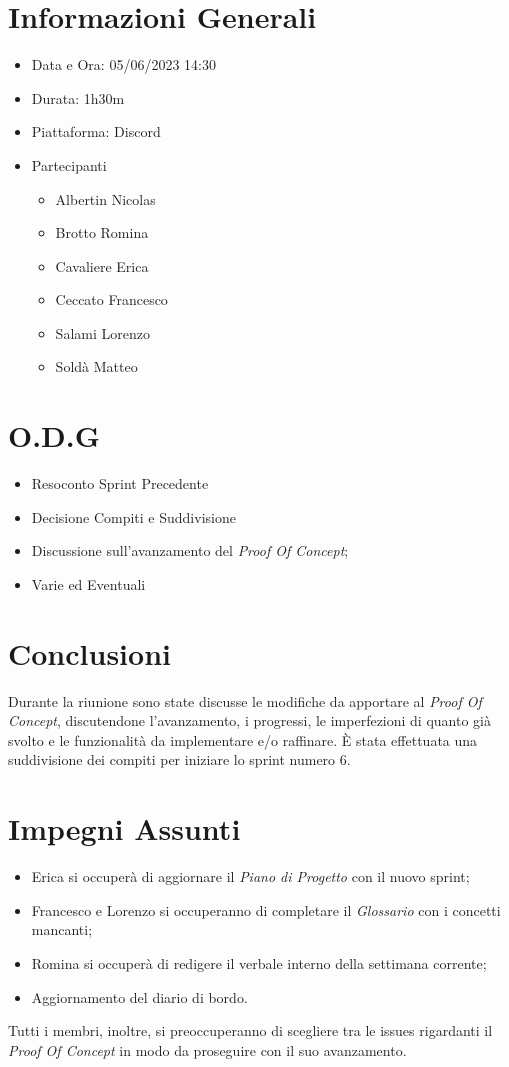 \documentclass[a4paper, 12pt]{article}
\begin{document}
\makefrontpage

\section*{Informazioni Generali}
\begin{itemize}
    \item Data e Ora: 05/06/2023 14:30
    \item Durata: 1h30m
    \item Piattaforma: Discord
    \item Partecipanti
    \begin{itemize}
        \item Albertin Nicolas
        \item Brotto Romina
        \item Cavaliere Erica
        \item Ceccato Francesco
        \item Salami Lorenzo
        \item Soldà Matteo
    \end{itemize}
\end{itemize}

\section*{O.D.G}
\begin{itemize}
    \item Resoconto Sprint Precedente
    \item Decisione Compiti e Suddivisione
    \item Discussione sull'avanzamento del \textit{Proof Of Concept};
    \item Varie ed Eventuali
\end{itemize}

\section*{Conclusioni}
Durante la riunione sono state discusse le modifiche da apportare al \textit{Proof Of Concept}, discutendone l'avanzamento, i progressi, le imperfezioni di quanto già svolto e le funzionalità da implementare e/o raffinare.
È stata effettuata una suddivisione dei compiti per iniziare lo sprint numero 6.

\section*{Impegni Assunti}
\begin{itemize}
    \item Erica si occuperà di aggiornare il \textit{Piano di Progetto} con il nuovo sprint;
    \item Francesco e Lorenzo si occuperanno di completare il \textit{Glossario} con i concetti mancanti;
    \item Romina si occuperà di redigere il verbale interno della settimana corrente;
    \item Aggiornamento del diario di bordo.
\end{itemize}
Tutti i membri, inoltre, si preoccuperanno di scegliere tra le issues rigardanti il \textit{Proof Of Concept} in modo da proseguire con il suo avanzamento.
\end{document}
